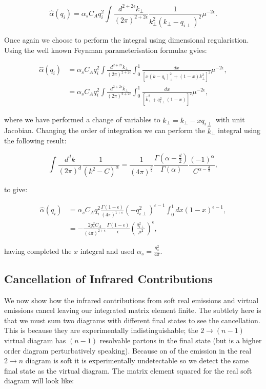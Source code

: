 		\begin{equation}
			\hat{\alpha}(q_i) = \alpha_sC_Aq_i^2\int \frac{d^{2+2\epsilon}k_{\perp}}{(2\pi)^{2+2\epsilon}}
			\frac{1}{k^2_\perp(k_\perp - q_{i\perp})^2}\mu^{-2\epsilon}.
		\end{equation}

		Once again we choose to perform the integral using dimensional regularistion.
		Using the well known Feynman parameterisation formulae gvies:

		\begin{align}
			\hat{\alpha}(q_i) &= \alpha_sC_Aq_i^2\int \frac{d^{2+2\epsilon}k_{\perp}}{(2\pi)^{2+2\epsilon}}\int_0^1
				\frac{dx}{[x(k - q_{i})^2_\perp + (1-x)k_\perp^2]^2}\mu^{-2\epsilon}, \\
				&= \alpha_sC_Aq_i^2\int \frac{d^{2+2\epsilon}\hat{k}_{\perp}}{(2\pi)^{2+2\epsilon}}\int_0^1
				\frac{dx}{[\hat{k}^2 _\perp + q_{i\perp}^2(1-x)]^2}\mu^{-2\epsilon},
		\end{align}

		where we have performed a change of variables to $\hat{k}_\perp = k_\perp - xq_{i\perp}$ with
		unit Jacobian.  Changing the order of integration we can perform the $\hat{k}_\perp$ integral
		using the following result:

		\begin{equation}
			\int \frac{d^dk}{(2\pi)^d}\frac{1}{(k^2 - C)^\alpha} = \frac{1}{(4\pi)^{\frac{d}{2}}}
				\frac{\Gamma(\alpha - \frac{d}{2})}{\Gamma(\alpha)}\frac{(-1)^\alpha}{C^{\alpha - \frac{d}{2}}},
		\end{equation}

		to give:

		\begin{align}
			\hat{\alpha}(q_i) &= \alpha_sC_Aq_i^2\frac{\Gamma(1-\epsilon)}{(4\pi)^{1+\epsilon}}(-q_{i\perp}^2)^{\epsilon-1}
				\int_0^1 dx(1-x)^{\epsilon-1}, \\
				&= -\frac{2g_s^2C_A}{(4\pi)^{2+\epsilon}}\frac{\Gamma(1-\epsilon)}{\epsilon}\left(\frac{q_{i\perp}^2}{\mu^2}\right)^\epsilon,
		\end{align}

		having completed the $x$ integral and used $\alpha_s=\frac{g_s^2}{4\pi}$.

	\subsection{Cancellation of Infrared Contributions}
		\label{sub:subsection_name}

		We now show how the infrared contributions from soft real emissions and virtual emissions cancel leaving
		our integrated matrix element finite.  The subtlety here is that we must sum two diagrams with different
		final states to see the cancellation.  This is because they are experimentally indistinguishable;
		the $2\rightarrow (n-1)$ virtual diagram has $(n-1)$ resolvable partons in the final state (but is a
		higher order diagram perturbatively speaking).  Because on of the emission in the real $2\rightarrow n$
		diagram is soft it is experimentally undetectable so we detect the same final state as the virtual diagram.
		The matrix element squared for the real soft diagram will look like:

